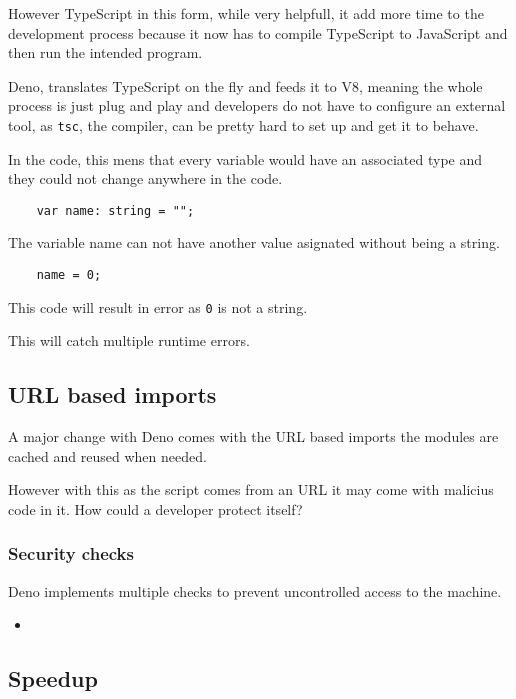 \documentclass[12pt, letterpaper]{article}
\begin{document}
\begin{multicols}{2}
    However TypeScript in this form, while very helpfull, it add more time to the development process because it now has to compile TypeScript to JavaScript and then run the intended program.

    Deno, translates TypeScript on the fly and feeds it to V8, meaning the whole process is just plug and play and developers do not have to configure an external tool, as \verb|tsc|, the compiler, can be pretty hard to set up and get it to behave.

    In the code, this mens that every variable would have an associated type and they could not change anywhere in the code.

    \begin{lstlisting}
    var name: string = "";
    \end{lstlisting}

    The variable name can not have another value asignated without being a string.

    \begin{lstlisting}
    name = 0;
    \end{lstlisting}

    This code will result in error as \verb|0| is not a string.

    This will catch multiple runtime errors.

    \subsection{URL based imports}

    A major change with Deno comes with the URL based imports the modules are cached and reused when needed.

    However with this as the script comes from an URL it may come with malicius code in it. How could a developer protect itself?

    \subsubsection{Security checks}

    Deno implements multiple checks to prevent uncontrolled access to the machine.

    \begin{itemize}
        \item
    \end{itemize}


    \subsection{Speedup}


\end{multicols}
\end{document}
